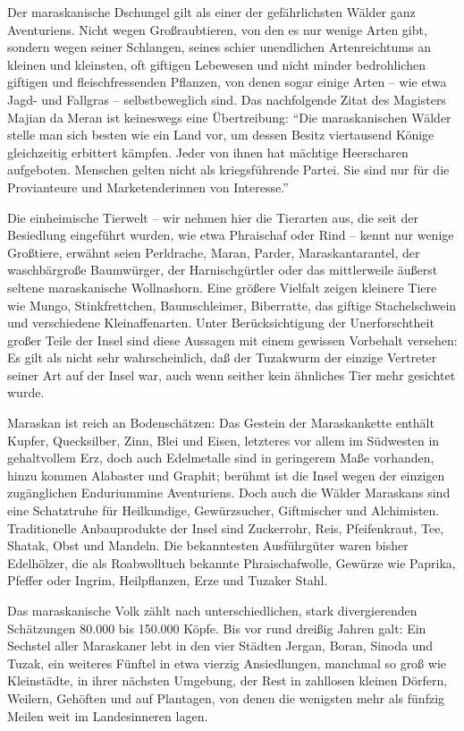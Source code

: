 Der maraskanische Dschungel gilt als einer der gefährlichsten Wälder ganz Aventuriens. Nicht wegen Großraubtieren, von den es nur wenige Arten gibt, sondern wegen seiner Schlangen, seines schier unendlichen Artenreichtums an kleinen und kleinsten, oft giftigen Lebewesen und nicht minder bedrohlichen giftigen und fleischfressenden Pflanzen, von denen sogar einige Arten -- wie etwa Jagd- und Fallgras -- selbstbeweglich sind. Das nachfolgende Zitat des Magisters Majian da Meran ist keineswegs eine Übertreibung: ``Die maraskanischen Wälder stelle man sich besten wie ein Land vor, um dessen Besitz viertausend Könige gleichzeitig erbittert kämpfen. Jeder von ihnen hat mächtige Heerscharen aufgeboten. Menschen gelten nicht als kriegsführende Partei. Sie sind nur für die Provianteure und Marketenderinnen von Interesse.''

Die einheimische Tierwelt -- wir nehmen hier die Tierarten aus, die seit der Besiedlung eingeführt wurden, wie etwa Phraischaf oder Rind -- kennt nur wenige Großtiere, erwähnt seien Perldrache, Maran, Parder, Maraskantarantel, der waschbärgroße Baumwürger, der Harnischgürtler oder das mittlerweile äußerst seltene maraskanische Wollnashorn. Eine größere Vielfalt zeigen kleinere Tiere wie Mungo, Stinkfrettchen, Baumschleimer, Biberratte, das giftige Stachelschwein und verschiedene Kleinaffenarten. Unter Berücksichtigung der Unerforschtheit großer Teile der Insel sind diese Aussagen mit einem gewissen Vorbehalt versehen: Es gilt als nicht sehr wahrscheinlich, daß der Tuzakwurm der einzige Vertreter seiner Art auf der Insel war, auch wenn seither kein ähnliches Tier mehr gesichtet wurde.

Maraskan ist reich an Bodenschätzen: Das Gestein der Maraskankette enthält Kupfer, Quecksilber, Zinn, Blei und Eisen, letzteres vor allem im Südwesten in gehaltvollem Erz, doch auch Edelmetalle sind in geringerem Maße vorhanden, hinzu kommen Alabaster und Graphit; berühmt ist die Insel wegen der einzigen zugänglichen Enduriummine Aventuriens. Doch auch die Wälder Maraskans sind eine Schatztruhe für Heilkundige, Gewürzsucher, Giftmischer und Alchimisten. Traditionelle Anbauprodukte der Insel sind Zuckerrohr, Reis, Pfeifenkraut, Tee, Shatak, Obst und Mandeln. Die bekanntesten Ausführgüter waren bisher Edelhölzer, die als Roabwolltuch bekannte Phraischafwolle, Gewürze wie Paprika, Pfeffer oder Ingrim, Heilpflanzen, Erze und Tuzaker Stahl.

Das maraskanische Volk zählt nach unterschiedlichen, stark divergierenden Schätzungen 80.000 bis 150.000 Köpfe. Bis vor rund dreißig Jahren galt: Ein Sechstel aller Maraskaner lebt in den vier Städten Jergan, Boran, Sinoda und Tuzak, ein weiteres Fünftel in etwa vierzig Ansiedlungen, manchmal so groß wie Kleinstädte, in ihrer nächsten Umgebung, der Rest in zahllosen kleinen Dörfern, Weilern, Gehöften und auf Plantagen, von denen die wenigsten mehr als fünfzig Meilen weit im Landesinneren lagen.



